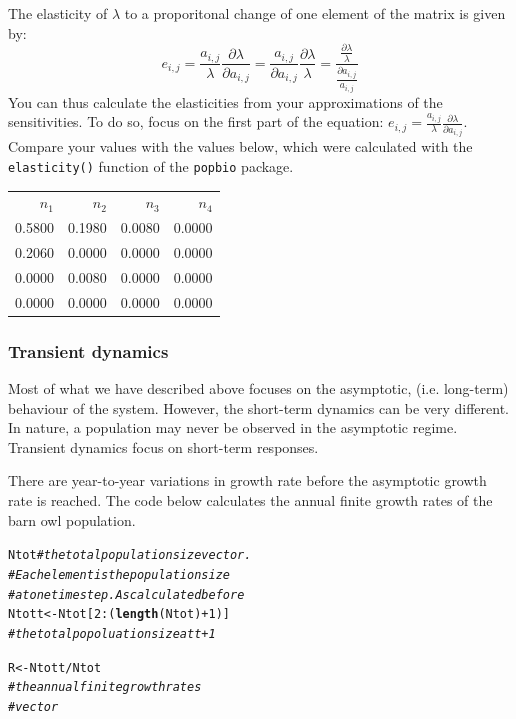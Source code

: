 \documentclass{article}\usepackage[]{graphicx}\usepackage[]{color}
\makeatletter
\newcommand{\hlnum}[1]{\textcolor[rgb]{0.686,0.059,0.569}{#1}}%
\newcommand{\hlcom}[1]{\textcolor[rgb]{0.678,0.584,0.686}{\textit{#1}}}%
\newcommand{\hlopt}[1]{\textcolor[rgb]{0,0,0}{#1}}%
\newcommand{\hlstd}[1]{\textcolor[rgb]{0.345,0.345,0.345}{#1}}%
\newcommand{\hlkwb}[1]{\textcolor[rgb]{0.69,0.353,0.396}{#1}}%
\newcommand{\hlkwd}[1]{\textcolor[rgb]{0.737,0.353,0.396}{\textbf{#1}}}%
\newenvironment{kframe}{%
 \def\at@end@of@kframe{}%
 \ifinner\ifhmode%
  \def\at@end@of@kframe{\end{minipage}}%
  \begin{minipage}{\columnwidth}%
 \fi\fi%
 \def\FrameCommand##1{\hskip\@totalleftmargin \hskip-\fboxsep
 \colorbox{shadecolor}{##1}\hskip-\fboxsep
     \hskip-\linewidth \hskip-\@totalleftmargin \hskip\columnwidth}%
 \MakeFramed {\advance\hsize-\width
   \@totalleftmargin\z@ \linewidth\hsize
   \@setminipage}}%
 {\par\unskip\endMakeFramed%
 \at@end@of@kframe}
\newenvironment{knitrout}{}{} %
\makeatother
\begin{document}
The elasticity of $\lambda$\; to a proporitonal change of one element of the matrix is given by:
\begin{equation}
e_{i,j}=\frac{a_{i,j}}{\lambda} \frac{\partial \lambda} {\partial a_{i,j}} = \frac{a_{i,j}}{\partial a_{i,j}} \frac{\partial \lambda}{\lambda} = \frac{\frac{\partial \lambda}{\lambda}}{\frac{\partial a_{i,j}}{ a_{i,j}}}
\end{equation}
You can thus calculate the elasticities from your approximations of the sensitivities. To do so, focus on the first part of the equation: $e_{i,j}=\frac{a_{i,j}}{\lambda} \frac{\partial \lambda} {\partial a_{i,j}}$.  Compare your values with the values below, which were calculated with the \texttt{elasticity()} function of the \texttt{popbio} package. 


{\footnotesize
\begin{tabular}{rrrr}
  
 $n_1$ & $n_2$ & $n_3$ & $n_4$ \\
 
 0.5800 & 0.1980 & 0.0080 & 0.0000 \\ 
  0.2060 & 0.0000 & 0.0000 & 0.0000 \\ 
  0.0000 & 0.0080 & 0.0000 & 0.0000 \\ 
  0.0000 & 0.0000 & 0.0000 & 0.0000 \\ 
   
\end{tabular}
}


\subsubsection{Transient dynamics}
Most of what we have described above focuses on the asymptotic, (i.e. long-term) behaviour of the system. However, the short-term dynamics can be very different. In nature, a population may never be observed in the asymptotic regime. Transient dynamics focus on short-term responses.   

There are year-to-year variations in growth rate before the asymptotic growth rate is reached. The code below calculates the annual finite growth rates of the barn owl population. 
\begin{knitrout}
\color{fgcolor}\begin{kframe}
\begin{alltt}
\hlstd{Ntot} \hlcom{# the total population size vector.}
     \hlcom{# Each element is the population size}
     \hlcom{# at one time step. As calculated before}
\hlstd{Ntott}\hlkwb{<-}\hlstd{Ntot[}\hlnum{2}\hlopt{:}\hlstd{(}\hlkwd{length}\hlstd{(Ntot)}\hlopt{+}\hlnum{1}\hlstd{)]}
\hlcom{# the total popoluation size at t+1}

\hlstd{R}\hlkwb{<-}\hlstd{Ntott}\hlopt{/}\hlstd{Ntot}
\hlcom{# the annual finite growth rates}
\hlcom{#vector}
\end{alltt}
\end{kframe}
\end{knitrout}
\end{document}
